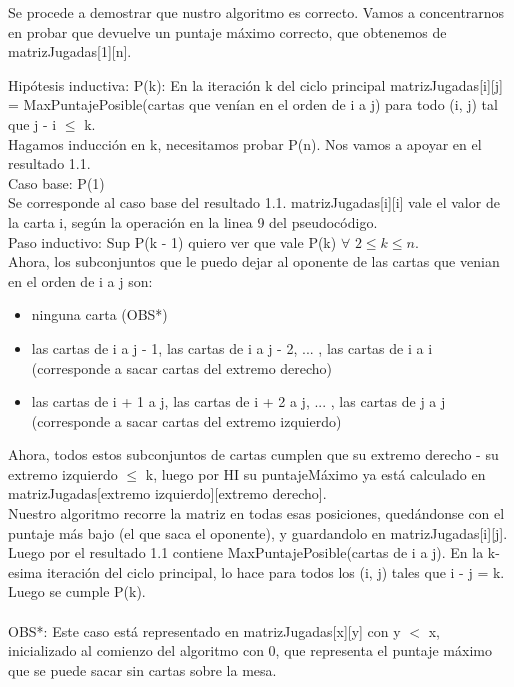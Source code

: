 \documentclass[11pt, a4paper, twoside]{article}
\begin{document}
{}

Se procede a demostrar que nustro algoritmo es correcto. Vamos a concentrarnos en probar que devuelve un puntaje máximo correcto, que obtenemos de matrizJugadas[1][n].

Hipótesis inductiva: P(k): En la iteración k del ciclo principal matrizJugadas[i][j] = MaxPuntajePosible(cartas que venían en el orden de i a j) para todo (i, j) tal que j - i $\leq$ k. 
\\Hagamos inducción en k, necesitamos probar P(n).
Nos vamos a apoyar en el resultado 1.1. 
\\Caso base: P(1)
\\Se corresponde al caso base del resultado 1.1. matrizJugadas[i][i] vale el valor de la carta i, según la operación en la linea 9 del pseudocódigo.
\\Paso inductivo: Sup P(k - 1) quiero ver que vale P(k) $\forall$ $2 \leq k \leq n$.
\\Ahora, los subconjuntos que le puedo dejar al oponente de las cartas que venian en el orden de i a j son:
\begin{itemize}
\item ninguna carta (OBS*)
\item las cartas de i a j - 1, las cartas de i a j - 2, ... , las cartas de i a i (corresponde a sacar cartas del extremo derecho) 
\item las cartas de i + 1 a j, las cartas de i + 2 a j, ... , las cartas de j a j (corresponde a sacar cartas del extremo izquierdo)
\end{itemize}
Ahora, todos estos subconjuntos de cartas cumplen que su extremo derecho - su extremo izquierdo $\leq$ k, luego por HI su puntajeMáximo ya está calculado en matrizJugadas[extremo izquierdo][extremo derecho].
\\Nuestro algoritmo recorre la matriz en todas esas posiciones, quedándonse con el puntaje más bajo (el que saca el oponente), y guardandolo en matrizJugadas[i][j]. Luego por el resultado 1.1 contiene MaxPuntajePosible(cartas de i a j). En la k-esima iteración del ciclo principal, lo hace para todos los (i, j) tales que i - j = k. Luego se cumple P(k).
\\\\OBS*: Este caso está representado en matrizJugadas[x][y] con y $<$ x, inicializado al comienzo del algoritmo con 0, que representa el puntaje máximo que se puede sacar sin cartas sobre la mesa.
\end{document}
